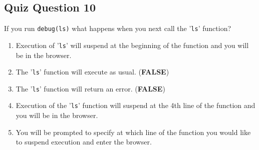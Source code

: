 \documentclass[12pt]{article}
\begin{document}
\newpage
\subsection*{Quiz Question 10}
If you run
\texttt{debug(ls)}
what happens when you next call the '\texttt{ls}' function?
\begin{enumerate}
\item Execution of '\texttt{ls}' will suspend at the beginning of the function and you will be in the browser.
\item The '\texttt{ls}' function will execute as usual. (\textbf{FALSE})
\item The '\texttt{ls}' function will return an error. (\textbf{FALSE})
\item Execution of the '\texttt{ls}' function will suspend at the 4th line of the function and you will be in the browser.
\item You will be prompted to specify at which line of the function you would like to suspend execution and enter the browser.
\end{enumerate}
\end{document}

